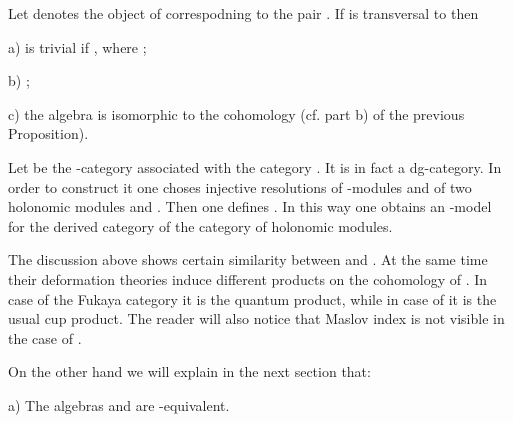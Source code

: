 \documentclass[a4paper,12pt]{article}
\begin{document}
\begin{prp} Let \coordHE{} denotes the object of \coordHE{}
correspodning to the pair \coordHE{}. If \coordHE{} is transversal
to \coordHE{} then 

a) \coordHE{} is trivial
if \coordHE{}, where \coordHE{};


b) \coordHE{};

c) the algebra \coordHE{}
is isomorphic to the cohomology \coordHE{}
(cf. part b) of the previous Proposition).

\end{prp}

 Let \coordHE{} be the \myHighlight{$\A$}\coordHE{}-category
 associated with the category \coordHE{}. 
It is in fact a dg-category. In order to construct it one
choses  injective resolutions of \coordHE{}-modules  \coordHE{} and \coordHE{}  of two 
holonomic modules \coordHE{} and \coordHE{}. Then one defines
 \coordHE{}.
In this way one obtains an \myHighlight{$\A$}\coordHE{}-model for the derived category
of the category of holonomic modules.

The discussion above shows certain similarity between 
\coordHE{} and \coordHE{}. At the same time their
deformation theories 
induce different products on the cohomology of \coordHE{}. In case of the 
Fukaya category it is the quantum product, while in case of \coordHE{} it is
the usual cup product. The reader  will also notice that Maslov index is not
visible in the case of \coordHE{}. 



On the other hand we will explain in the next section that:

a) The algebras \coordHE{} 
and  \coordHE{} are \myHighlight{$\A$}\coordHE{}-equivalent.
\end{document}
